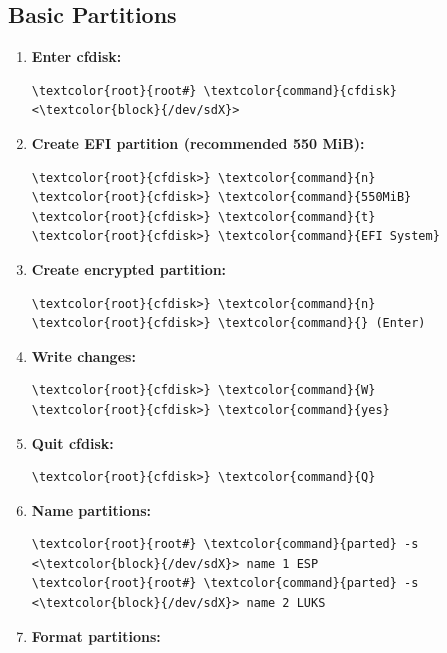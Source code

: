 \documentclass[10pt, a4paper, onecolumn, oneside, titlepage, openany]{book}
\begin{document}
\subsection{Basic Partitions}
\begin{enumerate}
    \item \textbf{Enter cfdisk:}
\begin{Verbatim}[commandchars=\\\{\}]
\textcolor{root}{root#} \textcolor{command}{cfdisk} <\textcolor{block}{/dev/sdX}>
\end{Verbatim}
    \item \textbf{Create EFI partition (recommended 550 MiB):}
\begin{Verbatim}[commandchars=\\\{\}]
\textcolor{root}{cfdisk>} \textcolor{command}{n}
\textcolor{root}{cfdisk>} \textcolor{command}{550MiB}
\textcolor{root}{cfdisk>} \textcolor{command}{t}
\textcolor{root}{cfdisk>} \textcolor{command}{EFI System}
\end{Verbatim}
    \item \textbf{Create encrypted partition:}
\begin{Verbatim}[commandchars=\\\{\}]
\textcolor{root}{cfdisk>} \textcolor{command}{n}
\textcolor{root}{cfdisk>} \textcolor{command}{} (Enter)
\end{Verbatim}
    \item \textbf{Write changes:}
\begin{Verbatim}[commandchars=\\\{\}]
\textcolor{root}{cfdisk>} \textcolor{command}{W}
\textcolor{root}{cfdisk>} \textcolor{command}{yes}
\end{Verbatim}
    \item \textbf{Quit cfdisk:}
\begin{Verbatim}[commandchars=\\\{\}]
\textcolor{root}{cfdisk>} \textcolor{command}{Q}
\end{Verbatim}
    \item \textbf{Name partitions:}
\begin{Verbatim}[commandchars=\\\{\}]
\textcolor{root}{root#} \textcolor{command}{parted} -s <\textcolor{block}{/dev/sdX}> name 1 ESP
\textcolor{root}{root#} \textcolor{command}{parted} -s <\textcolor{block}{/dev/sdX}> name 2 LUKS
\end{Verbatim}
    \item \textbf{Format partitions:}
    \begin{enumerate}

\end{enumerate}
\end{enumerate}
\end{document}
